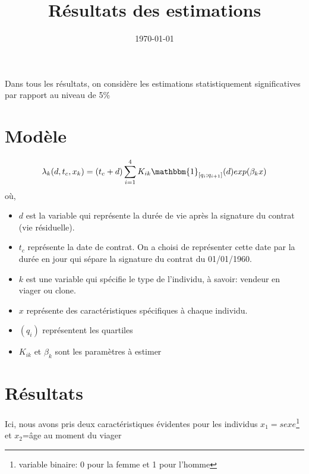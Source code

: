 \documentclass{article}
\title{Résultats des estimations}
\author{}
\date{\today}
\begin{document}
Dans tous les résultats, on considère les estimations statistiquement significatives par rapport au niveau de 5\%

\section{Modèle}
\begin{displaymath}
\lambda_{k}(d,t_c,x_k)=(t_c+d)\sum_{i=1}^{4}K_{ik}\mathbbm{1}_{\left[ q_i;q_{i+1}\right]}(d)exp(\beta_k x)
\end{displaymath}
où,
\begin{itemize}
\item $d$ est la variable qui représente la durée de vie après la signature du contrat (vie résiduelle).
\item $t_c$ représente la date de contrat. On a choisi de représenter cette date par la durée en jour qui sépare la signature du contrat du 01/01/1960.
\item $k$  est une variable qui spécifie le type de l’individu, à savoir: vendeur en viager ou clone.
\item $x$ représente des caractéristiques spécifiques à chaque individu.
\item $(q_i)$ représentent les quartiles 
\item $K_{ik}$ et $\beta_k$ sont les paramètres à estimer
\end{itemize}
\section{Résultats}
Ici, nous avons pris deux caractéristiques évidentes pour les individus $x_1=sexe$\footnote{variable binaire: 0 pour la femme et 1 pour l'homme} et $x_2$=âge au moment du viager\\
\end{document}
